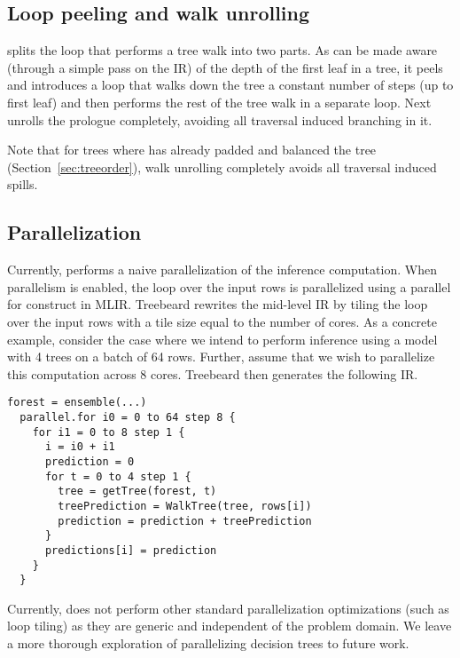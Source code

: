 \subsection{Loop peeling and walk unrolling}
\Treebeard{} splits the loop that performs a tree walk into two parts. As can be made aware (through a simple pass on the IR) of the depth of the first leaf in a tree, it peels and introduces a  loop that walks down the tree a constant number of steps (up to first leaf) and then performs the rest of the tree walk in a separate loop. Next \Treebeard{} unrolls the prologue completely, avoiding all traversal induced branching in it.

Note that for trees where \Treebeard{} has already padded and balanced the tree (Section~\ref{sec:treeorder}), walk unrolling completely avoids all traversal induced spills.


\subsection{Parallelization}
Currently, \Treebeard{} performs a naive parallelization of the inference computation. When parallelism is enabled, the 
loop over the input rows is parallelized using a parallel for construct in MLIR. Treebeard rewrites 
the mid-level IR by tiling the loop over the input rows with a tile size equal to the number of cores. 
As a concrete example, consider the case where we intend to perform inference using a model with 4 trees 
on a batch of 64 rows. Further, assume that we wish to parallelize this computation across 8 cores. 
Treebeard then generates the following IR.
\begin{lstlisting}[style=c++]
  forest = ensemble(...)
  parallel.for i0 = 0 to 64 step 8 {
    for i1 = 0 to 8 step 1 {
      i = i0 + i1
      prediction = 0
      for t = 0 to 4 step 1 {
        tree = getTree(forest, t) 
        treePrediction = WalkTree(tree, rows[i])
        prediction = prediction + treePrediction
      }
      predictions[i] = prediction
    }
  }
\end{lstlisting}
Currently, \Treebeard{} does not perform other standard parallelization optimizations  (such as loop tiling) as they are generic and independent of the problem domain. We leave a more thorough exploration of parallelizing decision trees
to future work.